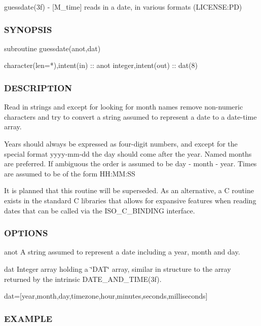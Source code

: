 guessdate(3f) -\/ \mbox{[}M\+\_\+time\mbox{]} reads in a date, in various formats (L\+I\+C\+E\+N\+SE\+:PD) 

\subsubsection*{S\+Y\+N\+O\+P\+S\+IS}

\begin{DoxyVerb}subroutine guessdate(anot,dat)

 character(len=*),intent(in) :: anot
 integer,intent(out)         :: dat(8)
\end{DoxyVerb}


\subsubsection*{D\+E\+S\+C\+R\+I\+P\+T\+I\+ON}

Read in strings and except for looking for month names remove non-\/numeric characters and try to convert a string assumed to represent a date to a date-\/time array.

Years should always be expressed as four-\/digit numbers, and except for the special format yyyy-\/mm-\/dd the day should come after the year. Named months are preferred. If ambiguous the order is assumed to be day -\/ month -\/ year. Times are assumed to be of the form H\+H\+:\+MM\+:SS

It is planned that this routine will be superseded. As an alternative, a C routine exists in the standard C libraries that allows for expansive features when reading dates that can be called via the I\+S\+O\+\_\+\+C\+\_\+\+B\+I\+N\+D\+I\+NG interface.

\subsubsection*{O\+P\+T\+I\+O\+NS}

anot A string assumed to represent a date including a year, month and day.

dat Integer array holding a \char`\"{}\+D\+A\+T\char`\"{} array, similar in structure to the array returned by the intrinsic D\+A\+T\+E\+\_\+\+A\+N\+D\+\_\+\+T\+I\+M\+E(3f).

dat=\mbox{[}year,month,day,timezone,hour,minutes,seconds,milliseconds\mbox{]}

\subsubsection*{E\+X\+A\+M\+P\+LE}

